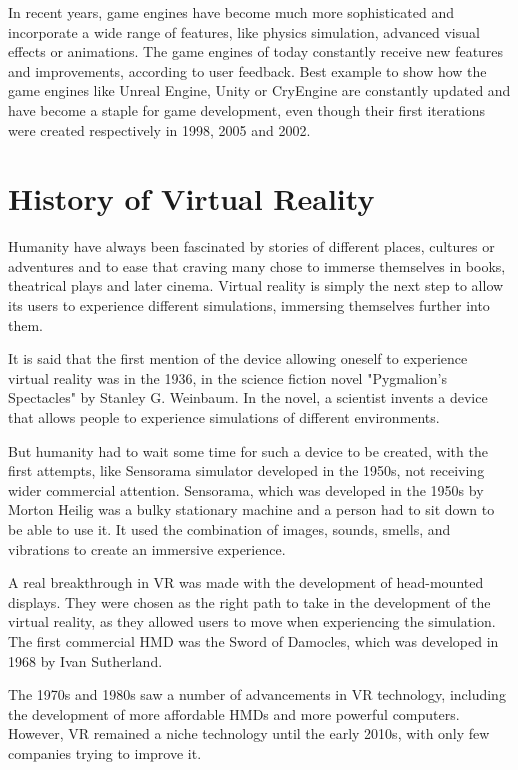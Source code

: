 
In recent years, game engines have become much more sophisticated and incorporate a wide range of features, like physics simulation, advanced visual effects or animations. The game engines of today constantly receive new features and improvements, according to user feedback. Best example to show how the game engines like Unreal Engine, Unity or CryEngine are constantly updated and have become a staple for game development, even though their first iterations were created respectively in 1998, 2005 and 2002.

\newpage
\section{History of Virtual Reality}
\label{sec:history_vr}
\hspace{\parindent}
Humanity have always been fascinated by stories of different places, cultures or adventures and to ease that craving many chose to immerse themselves in books, theatrical plays and later cinema. Virtual reality is simply the next step to allow its users to experience different simulations, immersing themselves further into them. 

It is said that the first mention of the device allowing oneself to experience virtual reality was in the 1936, in the science fiction novel "Pygmalion's Spectacles" by Stanley G. Weinbaum. In the novel, a scientist invents a device that allows people to experience simulations of different environments. 

But humanity had to wait some time for such a device to be created, with the first attempts, like Sensorama simulator developed in the 1950s, not receiving wider commercial attention. Sensorama, which was developed in the 1950s by Morton Heilig was a bulky stationary machine and a person had to sit down to be able to use it. It used the combination of images, sounds, smells, and vibrations to create an immersive experience.

A real breakthrough in VR was made with the development of head-mounted displays. They were chosen as the right path to take in the development of the virtual reality, as they allowed users to move when experiencing the simulation. The first commercial HMD was the Sword of Damocles, which was developed in 1968 by Ivan Sutherland.

The 1970s and 1980s saw a number of advancements in VR technology, including the development of more affordable HMDs and more powerful computers. However, VR remained a niche technology until the early 2010s, with only few companies trying to improve it.

